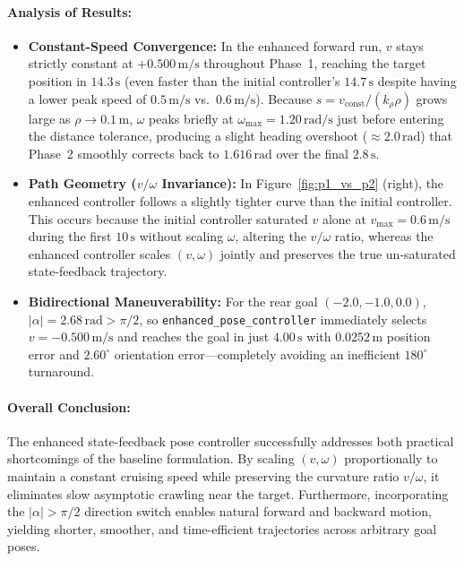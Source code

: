 \documentclass[11pt,a4paper]{article}
\begin{document}
\paragraph{Analysis of Results:}
\begin{itemize}
  \item \textbf{Constant-Speed Convergence:} In the enhanced forward run, $v$ stays strictly constant at $+0.500\,\text{m/s}$ throughout Phase~1, reaching the target position in $14.3\,\text{s}$ (even faster than the initial controller's $14.7\,\text{s}$ despite having a lower peak speed of $0.5\,\text{m/s}$ vs.\ $0.6\,\text{m/s}$). Because $s = v_{\text{const}}/(k_\rho \rho)$ grows large as $\rho \to 0.1\,\text{m}$, $\omega$ peaks briefly at $\omega_{\max} = 1.20\,\text{rad/s}$ just before entering the distance tolerance, producing a slight heading overshoot ($\approx 2.0\,\text{rad}$) that Phase~2 smoothly corrects back to $1.616\,\text{rad}$ over the final $2.8\,\text{s}$.
  \item \textbf{Path Geometry ($v/\omega$ Invariance):} In Figure~\ref{fig:p1_vs_p2} (right), the enhanced controller follows a slightly tighter curve than the initial controller. This occurs because the initial controller saturated $v$ alone at $v_{\max} = 0.6\,\text{m/s}$ during the first $10\,\text{s}$ without scaling $\omega$, altering the $v/\omega$ ratio, whereas the enhanced controller scales $(v, \omega)$ jointly and preserves the true un-saturated state-feedback trajectory.
  \item \textbf{Bidirectional Maneuverability:} For the rear goal $(-2.0, -1.0, 0.0)$, $|\alpha| = 2.68\,\text{rad} > \pi/2$, so \texttt{enhanced\_pose\_controller} immediately selects $v = -0.500\,\text{m/s}$ and reaches the goal in just $4.00\,\text{s}$ with $0.0252\,\text{m}$ position error and $2.60^\circ$ orientation error---completely avoiding an inefficient $180^\circ$ turnaround.
\end{itemize}

\paragraph{Overall Conclusion:}
The enhanced state-feedback pose controller successfully addresses both practical shortcomings of the baseline formulation. By scaling $(v, \omega)$ proportionally to maintain a constant cruising speed while preserving the curvature ratio $v/\omega$, it eliminates slow asymptotic crawling near the target. Furthermore, incorporating the $|\alpha| > \pi/2$ direction switch enables natural forward and backward motion, yielding shorter, smoother, and time-efficient trajectories across arbitrary goal poses.
\end{document}
